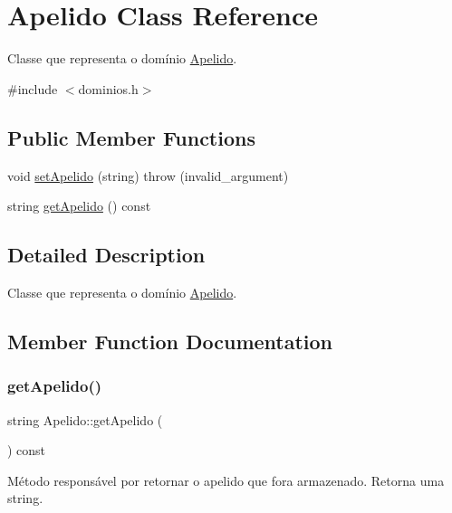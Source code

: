 \hypertarget{classApelido}{}\section{Apelido Class Reference}
\label{classApelido}


Classe que representa o domínio \hyperlink{classApelido}{Apelido}.  




{\ttfamily \#include $<$dominios.\+h$>$}

\subsection*{Public Member Functions}
\begin{DoxyCompactItemize}
\item 
void \hyperlink{classApelido_a2cb01229e3c1120858ef6c1f692432da}{set\+Apelido} (string)  throw (invalid\+\_\+argument)
\item 
string \hyperlink{classApelido_af3547459a5aff2cd4d6e2befe69ffe12}{get\+Apelido} () const
\end{DoxyCompactItemize}


\subsection{Detailed Description}
Classe que representa o domínio \hyperlink{classApelido}{Apelido}. 

\subsection{Member Function Documentation}
\mbox{\label{classApelido_af3547459a5aff2cd4d6e2befe69ffe12}} 
\subsubsection{\texorpdfstring{get\+Apelido()}{getApelido()}}
{\footnotesize\ttfamily string Apelido\+::get\+Apelido (\begin{DoxyParamCaption}{ }\end{DoxyParamCaption}) const\hspace{0.3cm}{\ttfamily [inline]}}

Método responsável por retornar o apelido que fora armazenado. Retorna uma string. \mbox{\label{classApelido_a2cb01229e3c1120858ef6c1f692432da}} 
